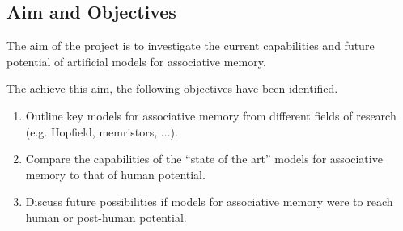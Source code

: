 \subsection{Aim and Objectives}

The aim of the project is to investigate the current capabilities and future potential of artificial models for associative memory.

The achieve this aim, the following objectives have been identified.

\begin{enumerate}
	\item Outline key models for associative memory from different fields of research (e.g. Hopfield, memristors, ...).
	\item Compare the capabilities of the ``state of the art'' models for associative memory to that of human potential.
	\item Discuss future possibilities if models for associative memory were to reach human or post-human potential.
\end{enumerate}
